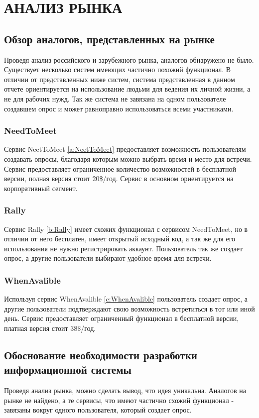 \documentclass[14pt]{extreport}
\begin{document}
\chapter{АНАЛИЗ РЫНКА \label{chapter2}}
\section{Обзор аналогов, представленных на рынке}
Проведя анализ российского и зарубежного рынка, аналогов обнаружено не было. Существует несколько систем имеющих частично похожий функционал. 
В отличии от представленных ниже систем, система представленная в данном отчете ориентируется на использование людьми для ведения их личной жизни, а не для рабочих нужд. Так же система не завязана на одном пользователе создавшем опрос и может равноправно использоваться всеми участниками.
\subsection{NeedToMeet}
Сервис NeetToMeet \eqref{a:NeetToMeet} предоставляет возможность пользователям создавать опросы, благодаря которым можно выбрать время и место для встречи. Сервис предоставляет ограниченное количество возможностей в бесплатной версии, полная версия стоит 20\$/год. Сервис в основном ориентируется на корпоративный сегмент. 
\subsection{Rally}
Сервис Rally \eqref{b:Rally} имеет схожих функционал с сервисом NeedToMeet, но в отличии от него бесплатен, имеет открытый исходный код, а так же для его использования не нужно регистрировать аккаунт. Пользователь так же создает опрос, а другие пользователи выбирают удобное время для встречи. 
\subsection{WhenAvalible}
Используя сервис WhenAvalible \eqref{c:WhenAvalible} пользователь создает опрос, а другие пользователи подтверждают свою возможность встретиться в тот или иной день. Сервис предоставляет ограниченный функционал в бесплатной версии, платная версия стоит 38\$/год.

\section{Обоснование необходимости разработки информационной системы }
Проведя анализ рынка, можно сделать вывод, что идея уникальна. Аналогов на рынке не найдено, а те сервисы, что имеют частично схожий функционал - завязаны вокруг одного пользователя, который создает опрос. 
\end{document}
